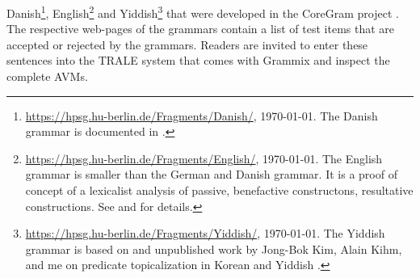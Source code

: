 Danish\footnote{
\url{https://hpsg.hu-berlin.de/Fragments/Danish/}, \today. The Danish grammar is documented in
. 
}, English\footnote{
\url{https://hpsg.hu-berlin.de/Fragments/English/}, \today. The English grammar is smaller than the
German and Danish grammar. It is a proof of concept of a lexicalist analysis of passive, benefactive
constructons, resultative constructions. See  and  for details.
} and Yiddish\footnote{
\url{https://hpsg.hu-berlin.de/Fragments/Yiddish/}, \today. The Yiddish grammar is based on
 and unpublished work by Jong-Bok Kim, Alain Kihm, and me on predicate
topicalization in Korean and Yiddish \citep*{MKK2019a}.
} that were developed in the CoreGram project \citep{MuellerCoreGram}. The respective web-pages of the grammars contain a list of test items
that are accepted or rejected by the grammars. Readers are invited to enter these
sentences into the TRALE system \citep{DKMM2004a-u,Penn2004a-u} that comes with Grammix and inspect the complete AVMs.

